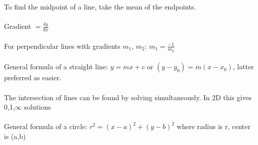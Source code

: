 \documentclass[class=article, crop=false]{standalone}
\begin{document}
To find the midpoint of a line, take the mean of the endpoints.\\\\
Gradient $= \frac{\delta y}{\delta x}$\\\\
For perpendicular lines with gradients $m_1$, $m_2$: $m_1 = \frac{-1}{m_2}$\\\\
General formula of a straight line: $y = mx + c$ or $(y-y_0)=m(x-x_0)$, latter preferred as easier.\\\\
The intersection of lines can be found by solving simultaneously. In 2D this gives 0,1,$\infty$ solutions\\\\
General formula of a circle: $r^2 = (x-a)^2 + (y-b)^2$ where radius is r, center is (a,b)\\\\
\end{document}
